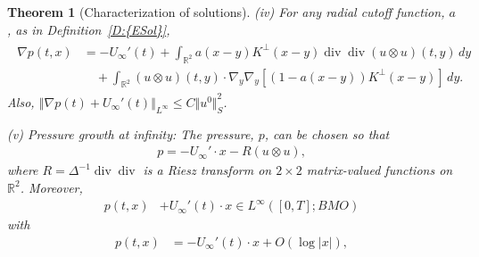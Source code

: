 \documentclass[reqno,openright,11pt,twoside]{amsart}
\newtheorem{theorem}{Theorem}[section]
\theoremstyle{definition}
\numberwithin{equation}{section}
\begin{document}
\begin{theorem}[Characterization of solutions]
	\noindent
	(iv)
	For any radial cutoff function, $a$, as in {Definition~\ref{D:{ESol}}},
	\begin{align}\label{e:gradpR2}
		\begin{split}
		{\ensuremath{\nabla}} p(t, x)
			&= -U_{\ensuremath{\infty}}'(t)
				+ \int_{{\ensuremath{{\ensuremath{\mathbb{{R}}}}}}^2} a(x - y) K^\perp(x - y)
				    \operatorname{div} \operatorname{div} (u \otimes u)(t, y) \, dy \\
			&\quad
	 			+ \int_{{\ensuremath{{\ensuremath{\mathbb{{R}}}}}}^2} (u \otimes u)(t, y) \cdot
					{\ensuremath{\nabla}}_y {\ensuremath{\nabla}}_y {\ensuremath{\left[ {(1 - a(x - y))
					K^\perp(x - y)} \right]}}
					\, dy.
		\end{split}
	\end{align}
	Also,
	${\ensuremath{\left\Vert {{\ensuremath{\nabla}} p(t) + U_{\ensuremath{\infty}}'(t)} \right\Vert}}_{L^{\ensuremath{\infty}}}
	\le C {\ensuremath{\Vert {u^0} \Vert}}_S^2$.
	
	\noindent
	(v) Pressure growth at infinity: The pressure, $p$,
	can be chosen so that
	\begin{align}\label{e:pRieszRel}
        p = -U_{\ensuremath{\infty}}' \cdot x
			        - R (u \otimes u),
    \end{align}
    where $R = \Delta^{-1} \operatorname{div} \operatorname{div}$ is a Riesz transform on
    $2 \times 2$ matrix-valued functions on ${\ensuremath{{\ensuremath{\mathbb{{R}}}}}}^2$.
    Moreover,
    \begin{align}\label{e:pBMO}
        p(t, x) &+ U_{\ensuremath{\infty}}'(t) \cdot x \in L^{\ensuremath{\infty}}([0, T]; BMO)   
    \end{align}
    with
	\begin{align}\label{e:pBoundR2}
	    	p(t, x)
	    	    &= -U_{\ensuremath{\infty}}'(t) \cdot x + O(\log {\left\vert{x}\right\vert}),
	\end{align}
\end{theorem}
\end{document}

